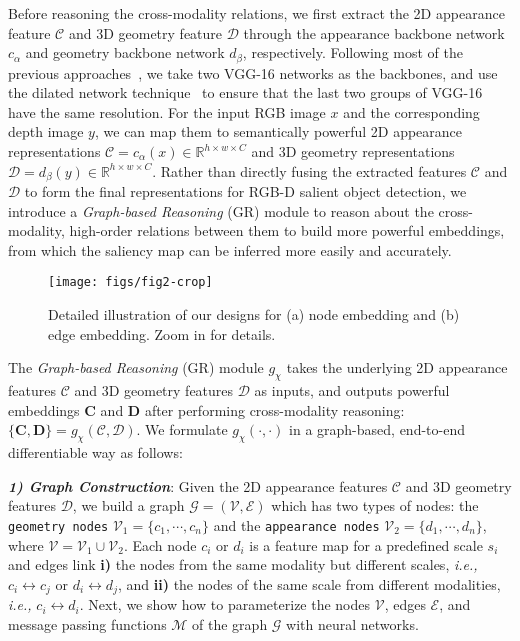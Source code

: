 \documentclass[runningheads]{llncs}
\begin{document}
		Before reasoning the cross-modality relations, we first extract the 2D appearance feature $\mathcal C$ and 3D geometry feature $\mathcal D$ through the appearance backbone network $c_{\alpha}$ and geometry backbone network $d_{\beta}$, respectively. Following most of the previous approaches~\cite{Piao_2019_ICCV,Chen_2018_CVPR,chen2019multi,han2017cnns,zhu2019pdnet}, we take two VGG-16 networks as the backbones, and use the dilated network technique~\cite{yu2015multi} to ensure that the last two groups of VGG-16 have the same resolution. For the input RGB image $x$ and the corresponding depth image $y$, we can map them to semantically powerful 2D appearance representations $\mathcal C = c_{\alpha}(x)\in \mathbb{R}^{h\times w \times C}$ and 3D geometry representations $\mathcal D = d_{\beta}(y) \in \mathbb{R}^{h\times w \times C}$. Rather than directly fusing the extracted features $\mathcal C$ and $\mathcal D$ to form the final representations for RGB-D salient object detection, we introduce a {\em Graph-based Reasoning} (GR) module to reason about the cross-modality, high-order relations between them to build more powerful embeddings, from which the saliency map can be inferred more easily and accurately. 
		
		    \begin{figure*}[pt]
			\begin{center}
				\texttt{[image: figs/fig2-crop]}
			\end{center}
			\caption{Detailed illustration of our designs for (a) node embedding and (b) edge embedding. Zoom in for details.}
			\label{fig:k}
		\end{figure*}

		The {\em Graph-based Reasoning} (GR) module $g_{\chi}$ takes the underlying 2D appearance features $\mathcal C$ and 3D geometry features $\mathcal D$ as inputs, and outputs powerful embeddings ${\mathbf C}$ and ${\mathbf D}$ after performing cross-modality reasoning: $\{\mathbf C, \mathbf D\} = g_{\chi}(\mathcal C, \mathcal D)$. We formulate $g_{\chi}(\cdot, \cdot)$ in a graph-based, end-to-end differentiable way as follows:
		
\noindent \emph{\textbf{\footnotesize 1) Graph Construction}}: Given the 2D appearance features $\mathcal C$ and 3D geometry features $\mathcal D$, we build a graph $\mathcal G = ({\mathcal V, \mathcal E})$ which has two types of nodes: the {\tt geometry nodes} $\mathcal V_1 = \{c_1,\cdots,c_n\}$ and the {\tt appearance nodes} $\mathcal V_2 = \{d_1,\cdots, d_n\}$, where $\mathcal V = \mathcal V_1 \cup \mathcal V_2$. Each node $c_i$ or $d_i$ is a feature map for a predefined scale $s_i$ and edges link {\bfseries \small i)} the nodes from the same modality but different scales, \emph{i.e.,} $c_i \leftrightarrow c_j$ or $d_i \leftrightarrow d_j$, and {\bfseries \small ii)} the nodes of the same scale from different modalities, \emph{i.e.,} $c_i \leftrightarrow d_i$. Next, we show how to parameterize the nodes $\mathcal V$, edges $\mathcal E$, and message passing functions $\mathcal M$ of the graph $\mathcal G$ with neural networks.
\end{document}
